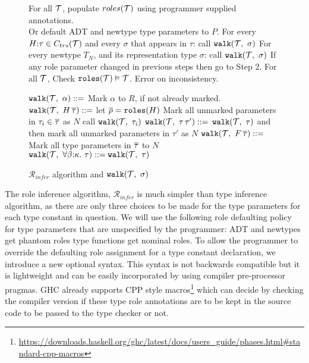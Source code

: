 \documentclass[screen,nonacm]{acmart}
\begin{document}
\newcommand\RoleInfer{$\mathcal{R}_{infer}$\xspace}
\newcommand\walk[2]{\texttt{walk}(#1,~#2)}
\begin{figure}[ht]
  \begin{algorithmic}[1]
    \Procedure{\RoleInfer}{[$\TypeConst$]}

    \State For all $\TypeConst$, populate $roles(\mathcal{T})$ using programmer supplied annotations. \\
    \qquad Or default ADT and newtype type parameters to $P$.
    \State For every $H{:}\tau \in C_{trs}(\mathcal{T})$ and every $\sigma$ that appears in $\tau$: call $\walk\TypeConst\sigma$\label{here}
    \State For every newtype $T_N$, and its representation type $\sigma$: call $\walk\TypeConst\sigma$
    \State If any role parameter changed in previous steps then go to Step 2.
    \State For all $\TypeConst$, Check $\texttt{roles}(\mathcal{T}) \mathrel{\vDash} \mathcal{T}$. Error on inconsistency.
    \EndProcedure
  \end{algorithmic}

  \begin{algorithmic}[1]
    \State $\walk \TypeConst {\alpha} \bnfeq$ Mark $\alpha$ to $R$, if not already marked.
    \State $\walk \TypeConst {H\App \many\tau} \bnfeq$ let $\overline{\rho} = \texttt{roles}(H)$
        \State Mark all unmarked parameters in $\tau_i \in \overline{\tau}$ as $N$
        \State call $\walk{\TypeConst}{\tau_i}$
    \EndIf
    \State $\walk \TypeConst {\tau\App\tau'} \bnfeq$ $\walk{\TypeConst}{\tau}$ and then mark all unmarked parameters in $\tau'$ as $N$
    \State $\walk \TypeConst {F\App\many\tau} \bnfeq$ Mark all type parameters in $\overline{\tau}$ to $N$
    \State $\walk \TypeConst {\Forall{\beta\co\kappa}\tau} \bnfeq \walk \TypeConst \tau$
    \EndProcedure
  \end{algorithmic}
\caption{\RoleInfer algorithm and $\walk\TypeConst\sigma$}\label{alg:role-infer}
\end{figure}

The role inference algorithm, \RoleInfer is much simpler than type inference algorithm, as there are only three choices to be made for the type parameters for each type constant in question. We will use the following role defaulting policy for type parameters that are unspecified by the programmer: ADT and newtypes get phantom roles type functions get nominal roles. To allow the programmer to override the defaulting role assignment for a type constant declaration, we introduce a new optional syntax.
This syntax is not backwards compatible but it is lightweight and can be easily incorporated by using compiler pre-processor pragmas. GHC already supports CPP style macros\footnote{\url{https://downloads.haskell.org/ghc/latest/docs/users\_guide/phases.html\#standard-cpp-macros}} which can decide by checking the compiler version if these type role annotations are to be kept in the source code to be passed to the type checker or not.
\end{document}
